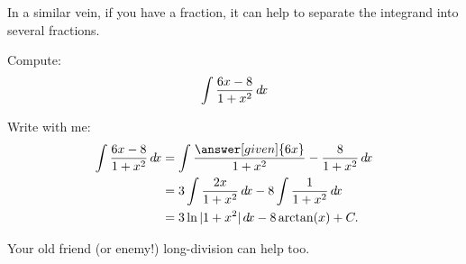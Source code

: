 \documentclass{ximera}
\begin{document}
In a similar vein, if you have a fraction, it can help to separate the
integrand into several fractions.

\begin{example}
  Compute:
  \[
  \int \frac{6x-8}{1+x^2}\mathop{}\!d\! x
  \]
  \begin{explanation}
    Write with me:
    \begin{align*}
      \int \frac{6x-8}{1+x^2}\d x &= \int \frac{\answer[given]{6x}}{1+x^2}-\frac{8}{1+x^2}\d x\\
      &= 3\int\frac{2x}{1+x^2}\d x -8\int \frac{1}{1+x^2}\d x\\
      &= 3\ln|1+x^2|\d x -8\arctan(x)+ C.\\
    \end{align*}
  \end{explanation}
\end{example}

Your old friend (or enemy!) long-division can help too.
\end{document}
